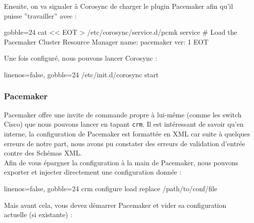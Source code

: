 \documentclass[11pt,a4paper]{report}
\begin{document}
                    Ensuite, on va signaler à Corosync de charger le plugin Pacemaker afin qu'il puisse ''travailler'' avec :\\
                    
                    \begin{bashcode*}{gobble=24}
                        cat << EOT > /etc/corosync/service.d/pcmk
                        service {
                                # Load the Pacemaker Cluster Resource Manager
                                name: pacemaker
                                ver:  1
                        }
                        EOT
                    \end{bashcode*}
                    
                    Une fois configuré, nous pouvons lancer Corosync :\\
                    
                    \begin{bashcode*}{linenos=false, gobble=24}
                        /etc/init.d/corosync start
                    \end{bashcode*}
                    
                \subsubsection{Pacemaker}
                    
                    Pacemaker offre une invite de commande propre à lui-même (comme les switch Cisco) que nous pouvons lancer en tapant \verb+crm+. Il est intéressant de savoir qu'en interne, la configuration de Pacemaker est formattée en XML car suite à quelques erreurs de notre part, nous avons pu constater des erreurs de validation d'entrée contre des Schémas XML.\\
                    
                    Afin de vous épargner la configuration à la main de Pacemaker, nous pouvons exporter et injecter directement une configuration donnée :\\
                    
                    \begin{bashcode*}{linenos=false, gobble=24}
                        crm configure load replace /path/to/conf/file
                    \end{bashcode*}
                    
                    Mais avant cela, vous devez démarrer Pacemaker et vider sa configuration actuelle (si existante) :\\
                    
\end{document}
